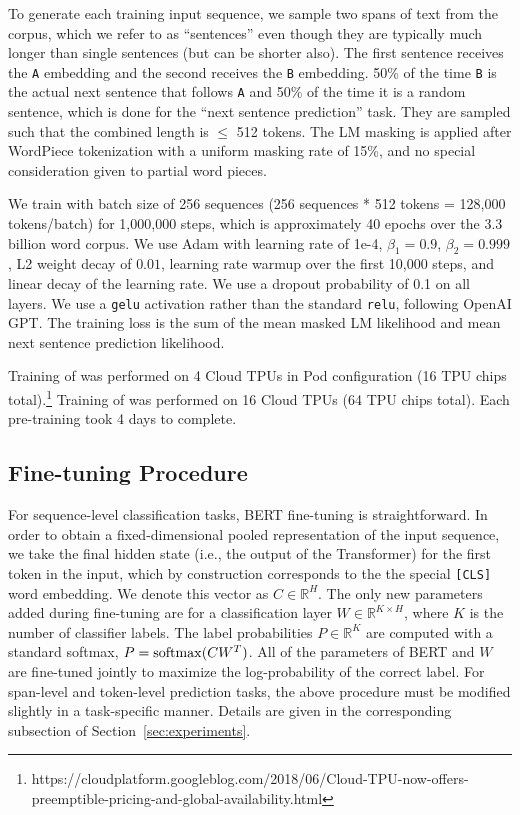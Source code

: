 To generate each training input sequence, we sample two spans of text from the corpus, which we refer to as ``sentences'' even though they are typically much longer than single sentences (but can be shorter also). The first sentence receives the {\tt A} embedding and the second receives the {\tt B} embedding. 50\% of the time {\tt B} is the actual next sentence that follows {\tt A} and 50\% of the time it is a random sentence, which is done for the ``next sentence prediction'' task. They are sampled such that the combined length is $\le$ 512 tokens. The LM masking is applied after WordPiece tokenization with a uniform masking rate of 15\%, and no special consideration given to partial word pieces.

We train with batch size of 256 sequences (256 sequences * 512 tokens = 128,000 tokens/batch) for 1,000,000 steps, which is approximately 40 epochs over the 3.3 billion word corpus. We use Adam with learning rate of 1e-4, ${\beta}_1=0.9$, ${\beta}_2=0.999$, L2 weight decay of $0.01$, learning rate warmup over the first 10,000 steps, and linear decay of the learning rate. We use a dropout probability of 0.1 on all layers. We use a {\tt gelu} activation \cite{hendrycks:2016} rather than the standard {\tt relu}, following OpenAI GPT. The training loss is the sum of the mean masked LM likelihood and mean next sentence prediction likelihood.

Training of \bertbase was performed on 4 Cloud TPUs in Pod configuration (16 TPU chips total).\footnote{https://cloudplatform.googleblog.com/2018/06/Cloud-TPU-now-offers-preemptible-pricing-and-global-availability.html} Training of \bertlarge was performed on 16 Cloud TPUs (64 TPU chips total). Each pre-training took 4 days to complete.

\subsection{Fine-tuning Procedure}
\label{sec:finetuning_procedure}

For sequence-level classification tasks, BERT fine-tuning is straightforward. In order to obtain a fixed-dimensional pooled representation of the input sequence, we take the final hidden state (i.e., the output of the Transformer) for the first token in the input, which by construction corresponds to the the special {\tt [CLS]} word embedding. We denote this vector as $C \in \mathbb{R}^{H}$. The only new parameters added during fine-tuning are for a classification layer $W \in \mathbb{R}^{K \times H}$, where $K$ is the number of classifier labels. The label probabilities $P \in \mathbb{R}^{K}$ are computed with a standard softmax, $P = {\rm softmax}(CW^T)$. All of the parameters of BERT and $W$ are fine-tuned jointly to maximize the log-probability of the correct label. For span-level and token-level prediction tasks, the above procedure must be modified slightly in a task-specific manner. Details are given in the corresponding subsection of Section~\ref{sec:experiments}.

